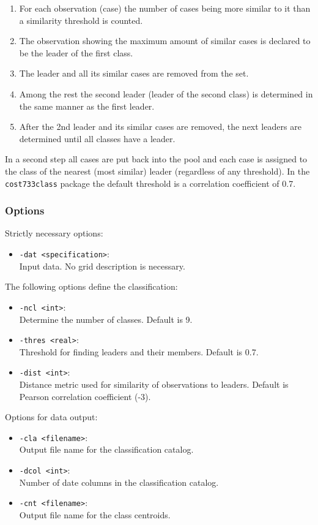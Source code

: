 \documentclass[12pt, oneside, a4paper, headsepline, plainheadsepline]{scrbook}
\begin{document}
\begin{enumerate}
\item For each observation (case) the number of cases being more similar to it than a similarity threshold is counted.
\item The observation showing the maximum amount of similar cases is declared to be the leader of the first class.
\item The leader and all its similar cases are removed from the set.
\item Among the rest the second leader (leader of the second class) is determined in the same manner as the first leader.
\item After the 2nd leader and its similar cases are removed, the next leaders are determined until all classes have a leader.
\end{enumerate}

In a second step all cases are put back into the pool and each case is assigned to 
the class of the nearest (most similar) leader (regardless of any threshold).
In the \verb+cost733class+ package the default threshold is a correlation coefficient of 0.7. 

\subsubsection*{Options}
Strictly necessary options:
\begin{itemize}
 \item \verb+-dat <specification>+:\\ Input data. No grid description is necessary.
\end{itemize}
The following options define the classification:
\begin{itemize}
 \item \verb+-ncl <int>+:\\ Determine the number of classes. Default is 9.
 \item \verb+-thres <real>+:\\ Threshold for finding leaders and their members. Default is 0.7.
 \item \verb+-dist <int>+:\\ Distance metric used for similarity of observations to leaders. Default is Pearson correlation coefficient (-3).
\end{itemize}
Options for data output:
\begin{itemize}
 \item \verb+-cla <filename>+:\\ Output file name for the classification catalog.
 \item \verb+-dcol <int>+:\\ Number of date columns in the classification catalog.
 \item \verb+-cnt <filename>+:\\ Output file name for the class centroids.
\end{itemize}
\end{document}
